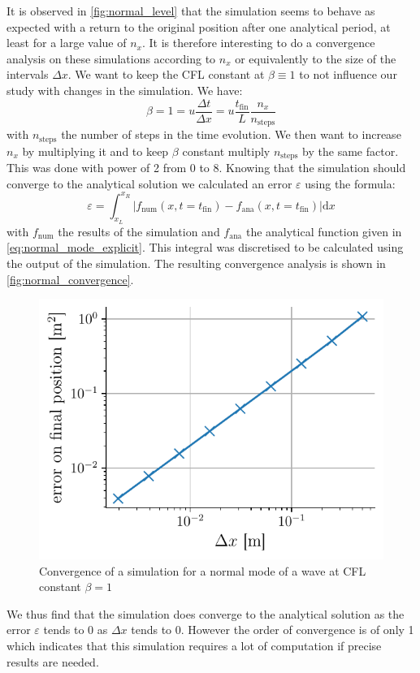 It is observed in \autoref{fig:normal_level} that the simulation seems to behave as expected with a return to the original position after one analytical period, at least for a large value of $n_x$. It is therefore interesting to do a convergence analysis on these simulations according to $n_x$ or equivalently to the size of the intervals $\Delta x$. We want to keep the CFL constant at $\beta \equiv 1$ to not influence our study with changes in the simulation. We have:
\begin{equation}
    \beta = 1 = u\frac{\Delta t}{\Delta x} = u \frac{t_\mathrm{fin}}{L}\frac{n_x}{n_\mathrm{steps}}
\end{equation}
with $n_\mathrm{steps}$ the number of steps in the time evolution. We then want to increase $n_x$ by multiplying it and to keep $\beta$ constant multiply $n_\mathrm{steps}$ by the same factor. This was done with power of 2 from 0 to 8. Knowing that the simulation should converge to the analytical solution we calculated an error $\varepsilon$ using the formula:
\begin{equation}
    \varepsilon = \int_{x_L}^{x_R} |f_\mathrm{num}(x, t=t_\mathrm{fin}) - f_\mathrm{ana}(x, t=t_\mathrm{fin})|\mathrm{d}x
\end{equation}
with $f_\mathrm{num}$ the results of the simulation and $f_\mathrm{ana}$ the analytical function given in \autoref{eq:normal_mode_explicit}. This integral was discretised to be calculated using the output of the simulation. The resulting convergence analysis is shown in \autoref{fig:normal_convergence}.
\begin{figure}[h]
    \centering
    \includegraphics[width=0.6\linewidth]{figures/bassin_mode_convergence.pdf}
    \caption{Convergence of a simulation for a normal mode of a wave at CFL constant $\beta = 1$}
    \label{fig:normal_convergence}
\end{figure}

We thus find that the simulation does converge to the analytical solution as the error $\varepsilon$ tends to 0 as $\Delta x$ tends to 0. However the order of convergence is of only 1 which indicates that this simulation requires a lot of computation if precise results are needed.

